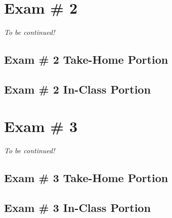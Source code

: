 \section{Exam \# 2 }
\textit{To be continued!}
\subsection{Exam \# 2 Take-Home Portion}
\subsection{Exam \# 2 In-Class Portion}

\section{Exam \# 3 }
\textit{To be continued!}
\subsection{Exam \# 3 Take-Home Portion}
\subsection{Exam \# 3 In-Class Portion}